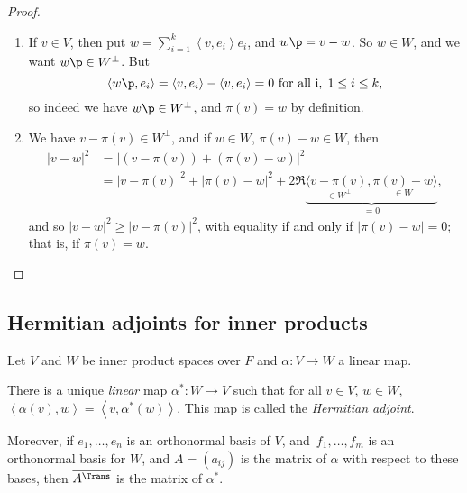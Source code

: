 \begin{proof}
\mbox{}
\begin{enumerate}
	\item If $v\in V$, then put $w=\sum_{i=1}^k \left\langle v,e_i \right\rangle e_i$, and $w\p=v-w$. So $w\in W$, and we want $w\p\in W^\perp$. But %
	\begin{equation*}
		\left\langle w\p,e_i \right\rangle = \left\langle v,e_i \right\rangle - \left\langle v,e_i \right\rangle = 0\text{ for all i},\; %
		1\leq i\leq k, %
	\end{equation*}
	so indeed we have $w\p\in W^\perp$, and $\pi(v)=w$ by definition.
	\item We have $v-\pi(v)\in W^\perp$, and if $w\in W$, $\pi(v)-w\in W$, then
	\begin{align*}
		\left\vert v-w \right\vert^2
		&= \left\vert \left( v-\pi (v) \right) + \left( \pi (v)-w \right) \right\vert^2 \\ %
		&= \left\vert v-\pi (v) \right\vert^2 + \left\vert \pi (v)-w \right\vert^2 + 2\Re \underbrace{\langle \underset{\in W^\perp}{v-\pi (v)}, %
		\underset{\in W}{\pi (v)-w}
		\rangle}_{=0},
	\end{align*}
	and so $\left\vert v-w \right\vert^2 \geq \left\vert v-\pi(v) \right\vert^2$, with equality if and only if $\left\vert \pi(v) - w \right\vert = 0$; that is, if $\pi(v)=w$. \qedhere %
\end{enumerate}
\end{proof}



\subsection{Hermitian adjoints for inner products} %
\label{sub:hermitian_adjoints_for_inner_products}

Let $V$ and $W$ be inner product spaces over $F$ and $\alpha:V\to W$ a linear map.

\begin{proposition}
	There is a unique \emph{linear} map $\alpha^*:W\to V$ such that for all $v\in V$, $w\in W$, $\left\langle \alpha(v),w \right\rangle=\left\langle v,\alpha^*(w) \right\rangle$. This map is called the \emph{Hermitian adjoint}. %
	
	Moreover, if $e_1,\ldots,e_n$ is an orthonormal basis of $V$, and $\,f_1,\ldots,f_m$ is an orthonormal basis for $W$, and $A=(a_{ij})$ is the matrix of $\alpha$ with respect to these bases, then $\overline{A^\Trans}$ %
	is the matrix of $\alpha^*$. %
\end{proposition}

